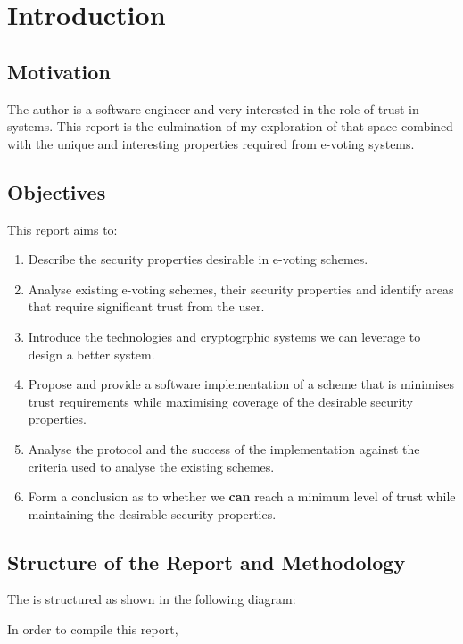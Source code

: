 \chapter{Introduction}
\label{ch:intro}

\section{Motivation}
\label{ch:intro:motiv}

The author is a software engineer and very interested in the role of trust in systems. This report is the culmination of my exploration of that space combined with the unique and interesting properties required from e-voting systems.


\section{Objectives}
\label{ch:intro:object}

This report aims to:

\begin{enumerate}
    \item Describe the security properties desirable in e-voting schemes.
    \item Analyse existing e-voting schemes, their security properties and identify areas that require significant trust from the user.
    \item Introduce the technologies and cryptogrphic systems we can leverage to design a better system.
    \item Propose and provide a software implementation of a scheme that is minimises trust requirements while maximising coverage of the desirable security properties.
    \item Analyse the protocol and the success of the implementation against the criteria used to analyse the existing schemes.
    \item Form a conclusion as to whether we {\textbf{can}} reach a minimum level of trust while maintaining the desirable security properties.
\end{enumerate}


\section{Structure of the Report and Methodology}
\label{ch:intro:method}

The is structured as shown in the following diagram:


In order to compile this report,

